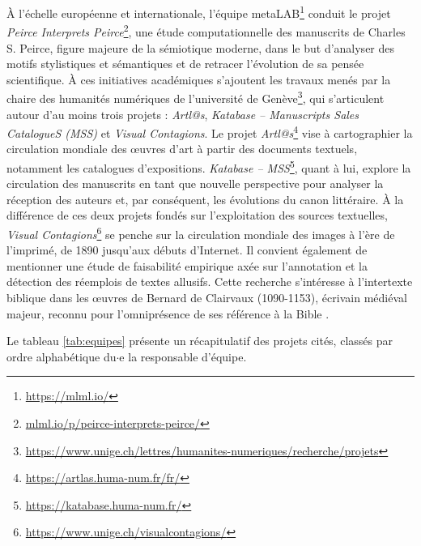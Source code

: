 À l'échelle européenne et internationale, l'équipe meta\textsc{LAB}\footnote{\url{https://mlml.io/}} conduit le projet \textit{Peirce Interprets Peirce}\footnote{\url{mlml.io/p/peirce-interprets-peirce/}}, une étude computationnelle des manuscrits de Charles S. Peirce, figure majeure de la sémiotique moderne, dans le but d'analyser des motifs stylistiques et sémantiques et de retracer l'évolution de sa pensée scientifique. À ces initiatives académiques s'ajoutent les travaux menés par la chaire des humanités numériques de l'université de Genève\footnote{\url{https://www.unige.ch/lettres/humanites-numeriques/recherche/projets}}, qui s'articulent autour d'au moins trois projets : \textit{Artl@s}, \textit{Katabase -- Manuscripts Sales CatalogueS (MSS)} et \textit{Visual Contagions}. Le projet \textit{Artl@s}\footnote{\url{https://artlas.huma-num.fr/fr/}} vise à cartographier la circulation mondiale des \oe{}uvres d'art à partir des documents textuels, notamment les catalogues d'expositions. \textit{Katabase -- MSS}\footnote{\url{https://katabase.huma-num.fr/}}, quant à lui, explore la circulation des manuscrits en tant que nouvelle perspective pour analyser la réception des auteurs et, par conséquent, les évolutions du canon littéraire. À la différence de ces deux projets fondés sur l'exploitation des sources textuelles, \textit{Visual Contagions}\footnote{\url{https://www.unige.ch/visualcontagions/}} se penche sur la circulation mondiale des images à l'ère de l'imprimé, de 1890 jusqu'aux débuts d'Internet. Il convient également de mentionner une étude de faisabilité empirique axée sur l'annotation et la détection des réemplois de textes allusifs. Cette recherche s'intéresse à l'intertexte biblique dans les \oe{}uvres de Bernard de Clairvaux (1090-1153), écrivain médiéval majeur, reconnu pour l'omniprésence de ses référence à la Bible \citep{manjavacas}.


Le tableau \ref{tab:equipes} présente un récapitulatif des projets cités, classés par ordre alphabétique du$\cdot$e la responsable d’équipe. 

